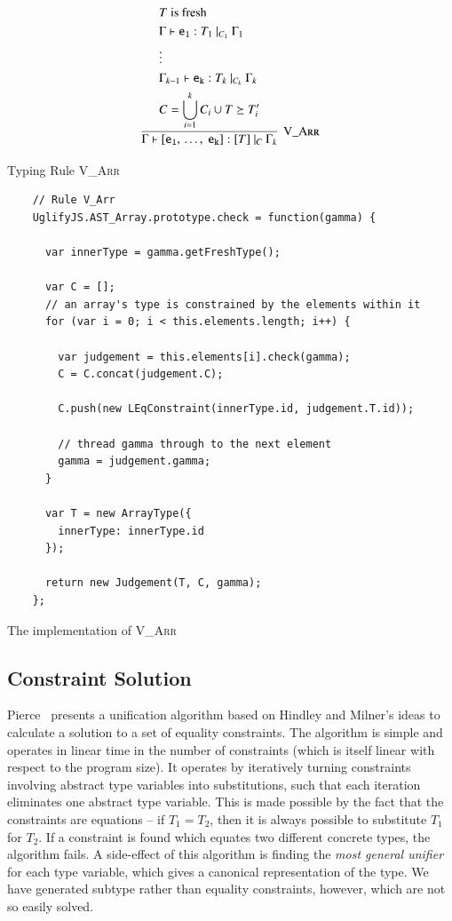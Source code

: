 \documentclass[12pt,a4paper,twoside,openright]{report}
\theoremstyle{definition}
\theoremstyle{dotless}
\begin{document}
\begin{listing}[H]
  $$\infer[\textsc{V\_Arr}]{
  	\Gamma\vdash\mathtt{[e_1,\, \ldots,\ e_k]}:[T]\ |_C\ \Gamma_k	
  }{ 
	\begin{split}
	  &T \textrm{ is fresh} \\
	  &\Gamma\vdash \mathtt{e_1}:T_1\ |_{C_1}\ \Gamma_1 \\
	  &\vdots \\
	  &\Gamma_{k-1}\vdash \mathtt{e_k}:T_k\ |_{C_k}\ \Gamma_k \\
	  &C=\bigcup_{i=1}^kC_i \cup {T \succeq T_i'}
	\end{split}	  
  }$$
  \caption{Typing Rule \textsc{V\_Arr}}
  \label{fig:arrrule}
\end{listing}
\begin{program}[H]
  \begin{verbatim}
    // Rule V_Arr
    UglifyJS.AST_Array.prototype.check = function(gamma) {

      var innerType = gamma.getFreshType();

      var C = [];
      // an array's type is constrained by the elements within it
      for (var i = 0; i < this.elements.length; i++) {

        var judgement = this.elements[i].check(gamma);
        C = C.concat(judgement.C);

        C.push(new LEqConstraint(innerType.id, judgement.T.id));

        // thread gamma through to the next element
        gamma = judgement.gamma;
      }

      var T = new ArrayType({
        innerType: innerType.id
      });

      return new Judgement(T, C, gamma);
    };
  \end{verbatim}
  \caption{The implementation of \textsc{V\_Arr}}\label{lst:arrimpl}
\end{program}
\vfill

\subsection{Constraint Solution}

Pierce~\cite{pierce} presents a unification algorithm based on Hindley and
Milner's ideas to calculate a solution to a set of equality constraints. The
algorithm is simple and operates in linear time in the number of constraints
(which is itself linear with respect to the program size). It operates by
iteratively turning constraints involving abstract type variables into
substitutions, such that each iteration eliminates one abstract type variable.
This is made possible by the fact that the constraints are equations -- if
$T_1=T_2$, then it is always possible to substitute $T_1$ for $T_2$. If a
constraint is found which equates two different concrete types, the algorithm
fails. A side-effect of this algorithm is finding the \textit{most general
  unifier} for each type variable, which gives a canonical
representation of the type.  We have generated subtype rather than equality constraints, however,
which are not so easily solved.
\end{document}
